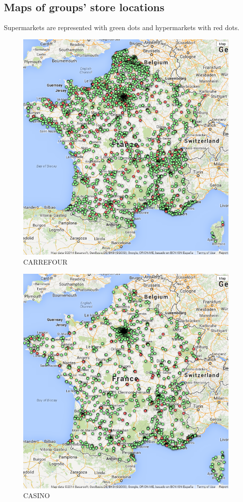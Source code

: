 \documentclass[11pt]{article}
\begin{document}
\subsection{Maps of groups' store locations}

Supermarkets are represented with green dots and hypermarkets with red dots.

\begin{figure}[!h]
    \caption{CARREFOUR}
	\centering
		\includegraphics[width=16cm]{images/CARREFOUR.png}
\end{figure}

\begin{figure}[!h]
    \caption{CASINO}
	\centering
		\includegraphics[width=16cm]{images/CASINO.png}
\end{figure}
\end{document}
